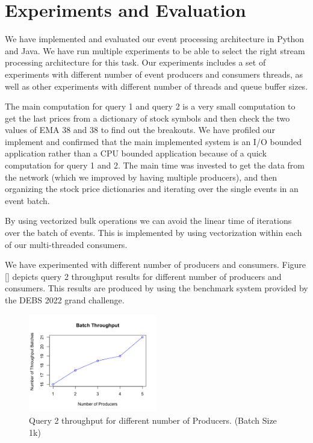 \section{Experiments and Evaluation}\label{sec:experiments}
We have implemented and evaluated our event processing architecture in Python and Java. We have run multiple experiments  to be 
able to select the right stream processing architecture for this task. Our experiments includes a set of experiments with different 
number of event producers and consumers threads, as well as other experiments with different number of threads and queue buffer sizes. 

The main computation for query 1 and query 2 is a very small computation to get the last prices from a dictionary of stock symbols and then 
check the two values of EMA 38 and 38 to find out the breakouts. We have profiled our implement and confirmed that the main implemented system 
is an I/O bounded application rather than a CPU bounded application because of a quick computation for query 1 and 2. The main time was 
invested to get the data from the network (which we improved by having multiple producers), and then organizing the stock price 
dictionaries and iterating over the single events in an event batch. 

By using vectorized bulk operations we can avoid the linear time of iterations over the batch of events. This is implemented by using 
vectorization within each of our multi-threaded consumers. 

We have experimented with different number of producers and consumers. 
Figure \ref{} depicts query 2 throughput results for different number of producers and consumers. 
This results are produced by using the benchmark system provided by the DEBS 2022 grand challenge. 


\begin{figure}[]
    \begin{center}
        \includegraphics[width=0.5\textwidth]{./images/throughput.png}
        \caption{Query 2 throughput for different number of Producers. (Batch Size 1k)}
        \label{fig:evaluation}
    \end{center}
\end{figure}





